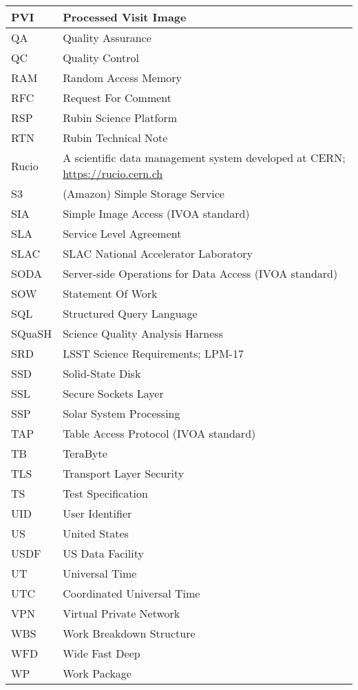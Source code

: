 \begin{longtable}{p{}p{}}
PVI & Processed Visit Image \\\hline
QA & Quality Assurance \\\hline
QC & Quality Control \\\hline
RAM & Random Access Memory \\\hline
RFC & Request For Comment \\\hline
RSP & Rubin Science Platform \\\hline
RTN & Rubin Technical Note \\\hline
Rucio & A scientific data management system developed at CERN; \url{https://rucio.cern.ch} \\\hline
S3 & (Amazon) Simple Storage Service \\\hline
SIA & Simple Image Access (IVOA standard) \\\hline
SLA & Service Level Agreement \\\hline
SLAC & SLAC National Accelerator Laboratory \\\hline
SODA & Server-side Operations for Data Access (IVOA standard) \\\hline
SOW & Statement Of Work \\\hline
SQL & Structured Query Language \\\hline
SQuaSH & Science Quality Analysis Harness \\\hline
SRD & LSST Science Requirements; LPM-17 \\\hline
SSD & Solid-State Disk \\\hline
SSL & Secure Sockets Layer \\\hline
SSP & Solar System Processing \\\hline
TAP & Table Access Protocol (IVOA standard) \\\hline
TB & TeraByte \\\hline
TLS & Transport Layer Security \\\hline
TS & Test Specification \\\hline
UID & User Identifier \\\hline
US & United States \\\hline
USDF & US Data Facility \\\hline
UT & Universal Time \\\hline
UTC & Coordinated Universal Time \\\hline
VPN & Virtual Private Network \\\hline
WBS & Work Breakdown Structure \\\hline
WFD & Wide Fast Deep \\\hline
WP & Work Package \\\hline
\end{longtable}
